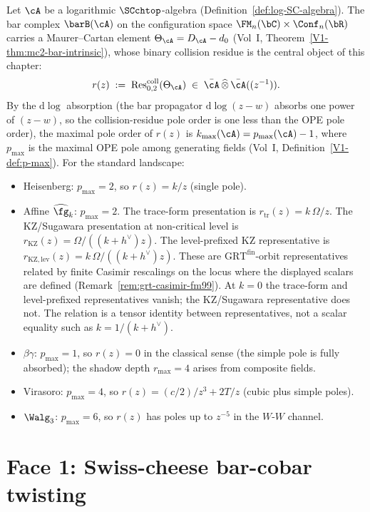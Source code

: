 Let $\cA$ be a logarithmic $\SCchtop$-algebra
\textup{(}Definition~\textup{\ref{def:log-SC-algebra}}\textup{)}. The bar complex
$\barB(\cA)$ on the configuration space $\FM_n(\bC)\times\Conf_n(\bR)$
carries a Maurer--Cartan element $\Theta_\cA = D_\cA - d_0$
\textup{(}Vol~I, Theorem~\textup{\ref{V1-thm:mc2-bar-intrinsic}}\textup{)}, whose
binary collision residue is the central object of this chapter:
\begin{equation}\label{eq:dnp-master-collision-residue}
r(z)
\;:=\;
\operatorname{Res}^{\mathrm{coll}}_{0,2}(\Theta_\cA)
\;\in\;
\bar{\cA}\,\widehat{\otimes}\,\bar{\cA}((z^{-1})).
\end{equation}
By the $\mathrm d\log$ absorption (the bar propagator
$\mathrm d\log(z-w)$ absorbs one power of $(z-w)$, so the
collision-residue pole order is one less than the OPE pole order),
the maximal pole order of $r(z)$ is $k_{\max}(\cA) = p_{\max}(\cA) - 1$, where
$p_{\max}$ is the maximal OPE pole among generating fields
\textup{(}Vol~I, Definition~\textup{\ref{V1-def:p-max}}\textup{)}. For the standard
landscape:
\begin{itemize}
\item Heisenberg: $p_{\max}=2$, so $r(z) = k/z$ (single pole).
\item Affine $\widehat{\fg}_k$: $p_{\max}=2$.  The trace-form
 presentation is $r_{\mathrm{tr}}(z)=k\,\Omega/z$.  The KZ/Sugawara
 presentation at non-critical level is
 $r_{\mathrm{KZ}}(z)=\Omega/((k+h^\vee)z)$.  The level-prefixed KZ
 representative is $r_{\mathrm{KZ,lev}}(z)=k\,\Omega/((k+h^\vee)z)$.
 These are $\mathrm{GRT}^{\mathrm{fin}}$-orbit representatives related
 by finite Casimir rescalings on the locus where the displayed scalars
 are defined (Remark~\ref{rem:grt-casimir-fm99}).  At $k=0$ the
 trace-form and level-prefixed representatives vanish; the
 KZ/Sugawara representative does not.  The relation is a tensor
 identity between representatives, not a scalar equality such as
 $k=1/(k+h^\vee)$.
\item $\beta\gamma$: $p_{\max}=1$, so $r(z) = 0$ in the classical sense
 (the simple pole is fully absorbed); the shadow depth $r_{\max}=4$
 arises from composite fields.
\item Virasoro: $p_{\max}=4$, so
 $r(z) = (c/2)/z^3 + 2T/z$ (cubic plus simple poles).
\item $\Walg_3$: $p_{\max}=6$, so $r(z)$ has poles up to $z^{-5}$ in the
 $W$-$W$ channel.
\end{itemize}

\section{Face 1: Swiss-cheese bar-cobar twisting}
\label{sec:face-1-bar-cobar}

